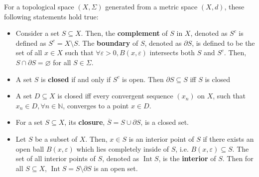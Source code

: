 \begin{theorem}
  For a topological space \( (X, \Sigma) \) generated from a metric space \( (X,
  d) \), these following statements hold true:
  \begin{itemize}
    \item Consider a set \( S \subseteq  X \). Then, the \textbf{complement} of \( S \)
      in \( X \), denoted as \( S^{c} \) is defined as \(
      S^{c} = X \setminus S \). The \textbf{boundary} of \( S \), denoted
      as \( \partial S \), is defined to be the set of all \( x \in X \) such
      that \( \forall \varepsilon > 0, B(x, \varepsilon) \) intersects both \(
      S \) and \( S^{c} \). Then, \( S \cap \partial S = \varnothing \)
      for all \( S \in \Sigma \).
    \item A set \( S \) is \textbf{closed} if and only if \( S^{c} \) is
      open. Then \( \partial S \subseteq S \) iff \( S \) is closed
    \item A set \( D \subseteq X \) is closed iff every convergent sequence \(
      (x_{n}) \) on \( X \), such that \( x_{n} \in D, \forall n \in \mathbb{N}
      \), converges to a point \( x \in D \).
    \item For a set \( S \subseteq  X \), its \textbf{closure}, \( \overline{S} =
      S \cup  \partial S\), is a closed set.
    \item Let \( S \) be a subset of \( X \). Then, \( x \in S \) is an
      interior point of \( S \) if there exists an open ball \( B(x,
      \varepsilon) \) which lies completely inside of \( S \), i.e. \( B(x,
      \varepsilon) \subseteq  S \). The set of all interior points of \( S \),
      denoted as \( \operatorname{Int} S \), is the \textbf{interior} of \( S
      \). Then for all \( S \subseteq  X \), \( \operatorname{Int} S = S \setminus
      \partial S\) is an open set.
  \end{itemize}
\end{theorem}

